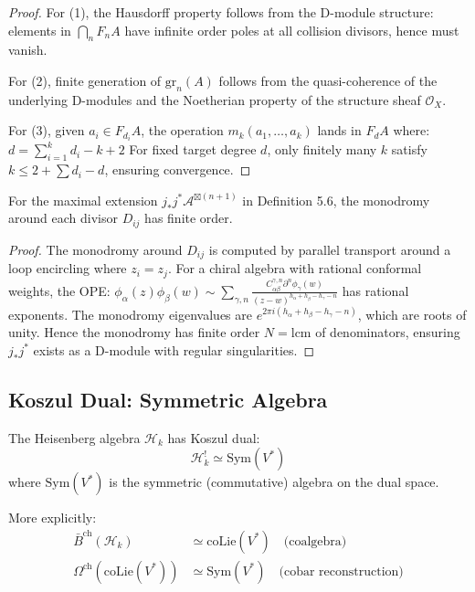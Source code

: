 \begin{proof}
For (1), the Hausdorff property follows from the D-module structure: elements in $\bigcap_n F_nA$ have infinite order poles at all collision divisors, hence must vanish.

For (2), finite generation of $\text{gr}_n(A)$ follows from the quasi-coherence of the underlying D-modules and the Noetherian property of the structure sheaf $\mathcal{O}_X$.

For (3), given $a_i \in F_{d_i}A$, the operation $m_k(a_1, \ldots, a_k)$ lands in $F_d A$ where:
$d = \sum_{i=1}^k d_i - k + 2$
For fixed target degree $d$, only finitely many $k$ satisfy $k \leq 2 + \sum d_i - d$, ensuring convergence.
\end{proof}

\begin{theorem}\label{thm:monodromy-finite}
For the maximal extension $j_*j^*\mathcal{A}^{\boxtimes(n+1)}$ in Definition 5.6, the monodromy around each divisor $D_{ij}$ has finite order.
\end{theorem}

\begin{proof}
The monodromy around $D_{ij}$ is computed by parallel transport around a loop encircling where $z_i = z_j$. For a chiral algebra with rational conformal weights, the OPE:
$\phi_\alpha(z)\phi_\beta(w) \sim \sum_{\gamma,n} \frac{C^{\gamma,n}_{\alpha\beta}\partial^n\phi_\gamma(w)}{(z-w)^{h_\alpha + h_\beta - h_\gamma - n}}$
has rational exponents. The monodromy eigenvalues are $e^{2\pi i(h_\alpha + h_\beta - h_\gamma - n)}$, which are roots of unity. Hence the monodromy has finite order $N = \text{lcm}$ of denominators, ensuring $j_*j^*$ exists as a D-module with regular singularities.
\end{proof}

\subsection{Koszul Dual: Symmetric Algebra}

\begin{theorem}\label{thm:heisenberg-koszul-dual-early}
The Heisenberg algebra $\mathcal{H}_k$ has Koszul dual:
$$\mathcal{H}_k^! \simeq \text{Sym}(V^*)$$
where $\text{Sym}(V^*)$ is the symmetric (commutative) algebra on the dual space.

More explicitly:
\begin{align}
\bar{B}^{\text{ch}}(\mathcal{H}_k) &\simeq \text{coLie}(V^*) \quad \text{(coalgebra)} \\
\Omega^{\text{ch}}(\text{coLie}(V^*)) &\simeq \text{Sym}(V^*) \quad \text{(cobar reconstruction)}
\end{align}
\end{theorem}

